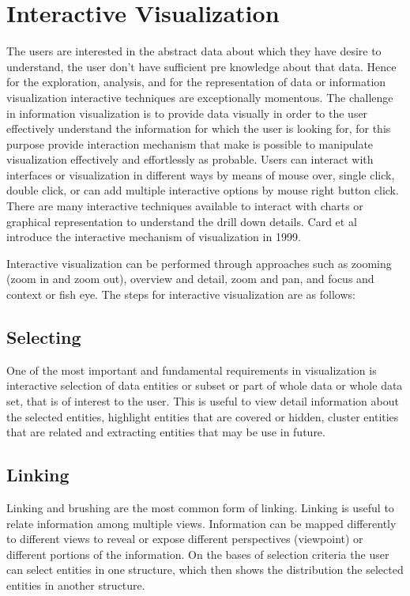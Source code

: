 \section{Interactive Visualization}
The users are interested in the abstract data about which they have desire to understand, the user don’t have sufficient pre knowledge about that data. Hence for the exploration, analysis, and for the representation of data or information visualization interactive techniques are exceptionally momentous. The challenge in information visualization is to provide data visually in order to the user effectively understand the information for which the user is looking for, for this purpose provide interaction mechanism that make is possible to manipulate visualization effectively and effortlessly as probable. Users can interact with interfaces or visualization in different ways by means of mouse over, single click, double click, or can add multiple interactive options by mouse right button click. There are many interactive techniques available to interact with charts or graphical representation to understand the drill down details. Card et al introduce the interactive mechanism of visualization in 1999.
\par
Interactive visualization can be performed through approaches such as zooming (zoom in and zoom out), overview and detail, zoom and pan, and focus and context or fish eye. The steps for interactive visualization are as follows:
\subsection{Selecting}
One of the most important and fundamental requirements in visualization is interactive selection of data entities or subset or part of whole data or whole data set, that is of interest to the user. This is useful to view detail information about the selected entities, highlight entities that are covered or hidden, cluster entities that are related and extracting entities that may be use in future.
\subsection{Linking}
Linking and brushing are the most common form of linking. Linking is useful to relate information among multiple views. Information can be mapped differently to different views to reveal or expose different perspectives (viewpoint) or different portions of the information. On the bases of selection criteria the user can select entities in one structure, which then shows the distribution the selected entities in another structure.
